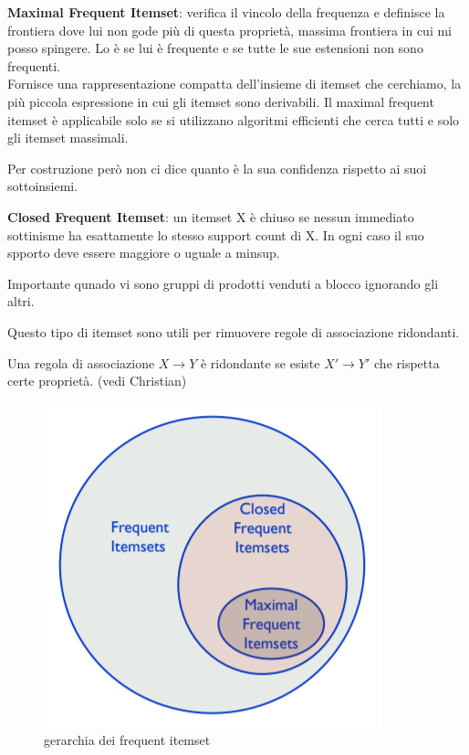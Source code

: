 \textbf{Maximal Frequent Itemset}: verifica il vincolo della frequenza e definisce la frontiera dove lui non gode pi\`u di questa propriet\`a, massima frontiera in cui mi posso spingere. Lo \`e se lui \`e frequente e se tutte le sue estensioni non sono frequenti.\\
Fornisce una rappresentazione compatta dell'insieme di itemset che cerchiamo, la pi\`u piccola espressione in cui gli itemset sono derivabili. Il maximal frequent itemset \`e applicabile solo se si utilizzano algoritmi efficienti che cerca tutti e solo gli itemset massimali.

Per costruzione per\`o non ci dice quanto \`e la sua confidenza rispetto ai suoi sottoinsiemi. 

\textbf{Closed Frequent Itemset}: un itemset X \`e chiuso se nessun immediato sottinisme ha esattamente lo stesso support count di X. In ogni caso il suo spporto deve essere maggiore o uguale a minsup.

Importante qunado vi sono gruppi di prodotti venduti a blocco ignorando gli altri.

Questo tipo di itemset sono utili per rimuovere regole di associazione ridondanti. 

Una regola di associazione $X \rightarrow Y$ \`e ridondante se esiste $X' \rightarrow Y'$ che rispetta certe propriet\`a. (vedi Christian)

\begin{figure}[H]
	\centering
	\includegraphics[height=0.45 \linewidth]{association/pict/itemset_freq.png}
	\caption{gerarchia dei frequent itemset}
\end{figure}

